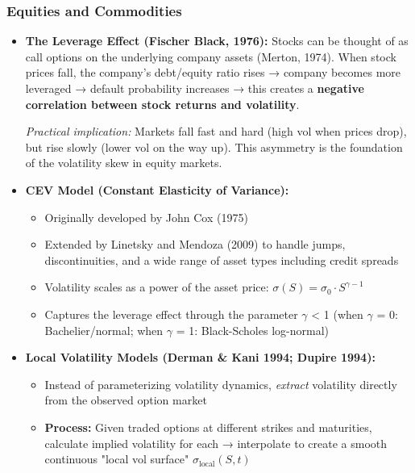\documentclass[12pt,openany]{book}
\theoremstyle{definition}
\theoremstyle{remark}
\begin{document}
\subsubsection{Equities and Commodities}
\begin{itemize}
\item \textbf{The Leverage Effect (Fischer Black, 1976):} Stocks can be thought of as call options on the underlying company assets (Merton, 1974). When stock prices fall, the company's debt/equity ratio rises → company becomes more leveraged → default probability increases → this creates a \textbf{negative correlation between stock returns and volatility}.

\emph{Practical implication:} Markets fall fast and hard (high vol when prices drop), but rise slowly (lower vol on the way up). This asymmetry is the foundation of the volatility skew in equity markets.


\item \textbf{CEV Model (Constant Elasticity of Variance):}

\begin{itemize}
\item Originally developed by John Cox (1975)


\item Extended by Linetsky and Mendoza (2009) to handle jumps, discontinuities, and a wide range of asset types including credit spreads


\item Volatility scales as a power of the asset price: $\sigma(S) = \sigma_0 \cdot S^{\gamma - 1}$


\item Captures the leverage effect through the parameter \(\gamma\) < 1 (when \(\gamma\) = 0: Bachelier/normal; when \(\gamma\) = 1: Black-Scholes log-normal)


\end{itemize}

\item \textbf{Local Volatility Models (Derman \& Kani 1994; Dupire 1994):}

\begin{itemize}
\item Instead of parameterizing volatility dynamics, \emph{extract} volatility directly from the observed option market


\item \textbf{Process:} Given traded options at different strikes and maturities, calculate implied volatility for each → interpolate to create a smooth continuous "local vol surface" $\sigma_{\text{local}}(S, t)$



\end{itemize}
\end{itemize}
\end{document}
